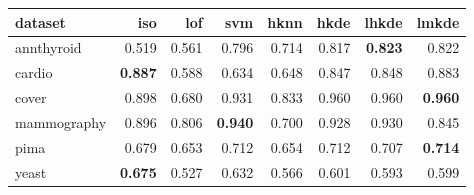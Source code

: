 \begin{tabular}{l|rrr|rrrr}
  \toprule
dataset & iso & lof & svm & hknn & hkde & lhkde & lmkde \\ 
  \midrule
annthyroid & 0.519 & 0.561 & 0.796 & 0.714 & 0.817 & {\bf 0.823} & 0.822 \\ 
  cardio & {\bf 0.887} & 0.588 & 0.634 & 0.648 & 0.847 & 0.848 & 0.883 \\ 
  cover & 0.898 & 0.680 & 0.931 & 0.833 & 0.960 & 0.960 & {\bf 0.960} \\ 
  mammography & 0.896 & 0.806 & {\bf 0.940} & 0.700 & 0.928 & 0.930 & 0.845 \\ 
  pima & 0.679 & 0.653 & 0.712 & 0.654 & 0.712 & 0.707 & {\bf 0.714} \\ 
  yeast & {\bf 0.675} & 0.527 & 0.632 & 0.566 & 0.601 & 0.593 & 0.599 \\ 
   \bottomrule
\end{tabular}
